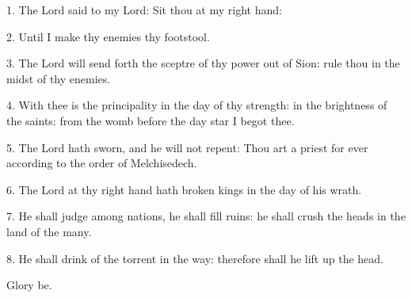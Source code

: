  1. The Lord said to my Lord: Sit thou at my right hand:
 
 2. Until I make thy enemies thy footstool.
 
 3. The Lord will send forth the sceptre of thy power out of Sion: rule thou in the midst of thy enemies.
 
 4. With thee is the principality in the day of thy strength: in the brightness of the saints:
 from the womb before the day star I begot thee.
 
 5. The Lord hath sworn, and he will not repent: Thou art a priest for ever according to the order of Melchisedech.
 
 6. The Lord at thy right hand hath broken kings in the day of his wrath.

7. He shall judge among nations, he shall fill ruins: he shall crush the heads in the land of the many.

8. He shall drink of the torrent in the way: therefore shall he lift up the head. 

Glory be.